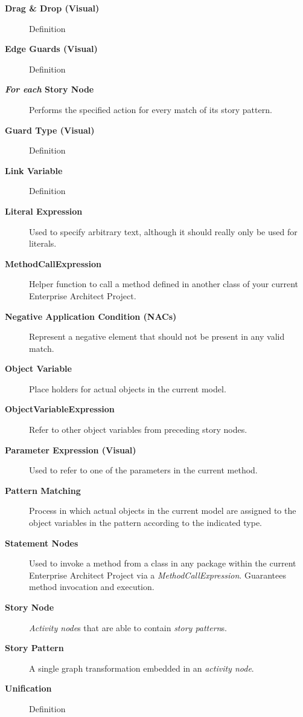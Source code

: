 \begin{description}
\item[\bf Drag \& Drop (Visual)]
Definition

\item[\bf Edge Guards (Visual)]
Definition

\item[\bf \emph{For each} Story Node]
Performs the specified action for every match of its story pattern.

\item[\bf Guard Type (Visual)]
Definition

\item[\bf Link Variable]
Definition 

\item[\bf Literal Expression]
Used to specify arbitrary text, although it should really only be used for literals.

\item[\bf MethodCallExpression]
Helper function to call a method defined in another class of your current Enterprise Architect Project.

\item[\bf Negative Application Condition (NACs)]
Represent a negative element that should not be present in any valid match.

\item[\bf Object Variable]
Place holders for actual objects in the current model.

\item[\bf ObjectVariableExpression]
Refer to other object variables from preceding story nodes.

\item[\bf Parameter Expression (Visual)]
Used to refer to one of the parameters in the current method.

\item[\bf Pattern Matching]
Process in which actual objects in the current model are assigned to the object variables in the pattern according to the indicated type.

\item[\bf Statement Nodes]
Used to invoke a method from a class in any package within the current Enterprise Architect Project via a \emph{MethodCallExpression}. Guarantees method
invocation and execution.

\item[\bf Story Node]
\emph{Activity node}s that are able to contain \emph{story pattern}s.

\item[\bf Story Pattern]
A single graph transformation embedded in an \emph{activity node}.

\item[\bf Unification]
Definition 

\end{description}